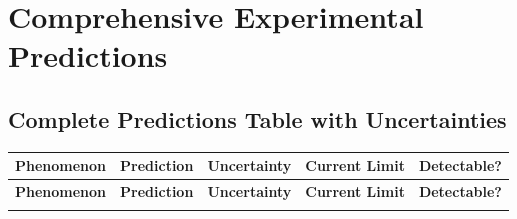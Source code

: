 \documentclass[11pt]{article}
\theoremstyle{definition}
\begin{document}
\section{Comprehensive Experimental Predictions}

\subsection{Complete Predictions Table with Uncertainties}

\begin{center}
\begin{longtable}{|l|c|c|c|c|}
\hline
\textbf{Phenomenon} & \textbf{Prediction} & \textbf{Uncertainty} & \textbf{Current Limit} & \textbf{Detectable?} \\
\hline
\endfirsthead
\hline
\textbf{Phenomenon} & \textbf{Prediction} & \textbf{Uncertainty} & \textbf{Current Limit} & \textbf{Detectable?} \\
\hline
\endhead
\hline
\endfoot
\hline
\endlastfoot


\end{longtable}
\end{center}
\end{document}
